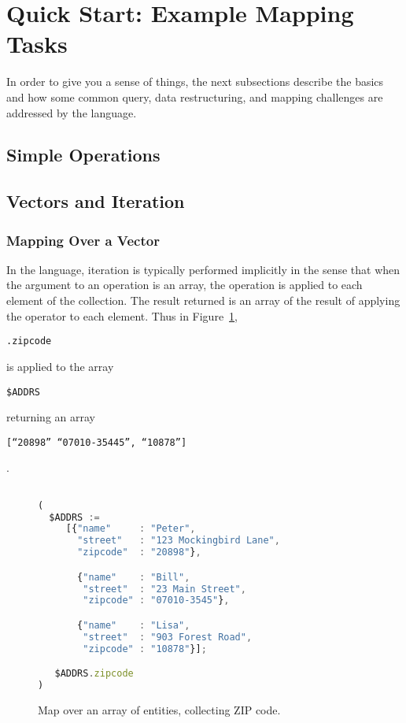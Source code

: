 \documentclass[9pt,letterpaper]{article}
\newcommand{\stt}[1]{\begin{footnotesize}\texttt{#1}\end{footnotesize}}
\begin{document}
\section{Quick Start: Example Mapping Tasks}

In order to give you a sense of things, the next subsections describe the basics and how some common query, data restructuring, and mapping challenges are addressed by the language.

\subsection{Simple Operations}

\subsection{Vectors and Iteration}

\subsubsection{Mapping Over a Vector}
In the language, iteration is typically performed implicitly in the sense that when the argument to an operation is an array, the operation is applied to each element of the collection.
The result returned is an array of the result of applying the operator to each element.
Thus in Figure~\ref{code:simple-map}, \stt{.zipcode} is applied to the array \stt{\$ADDRS} returning  an array \stt{[``20898'' ``07010-35445'', ``10878'']}.

\lstset{
    basicstyle=\footnotesize\ttfamily
  }

\begin{figure}[H]
\caption{Map over an array of entities, collecting ZIP code.}
 \label{code:simple-map}
\begin{lstlisting}[language=JavaScript,basicstyle=\ttfamily\scriptsize]

(
  $ADDRS :=
     [{"name"     : "Peter",
       "street"   : "123 Mockingbird Lane",
       "zipcode"  : "20898"},

       {"name"    : "Bill",
        "street"  : "23 Main Street",
        "zipcode" : "07010-3545"},

       {"name"    : "Lisa",
        "street"  : "903 Forest Road",
        "zipcode" : "10878"}];

   $ADDRS.zipcode
)

\end{lstlisting}
\end{figure}
\end{document}
